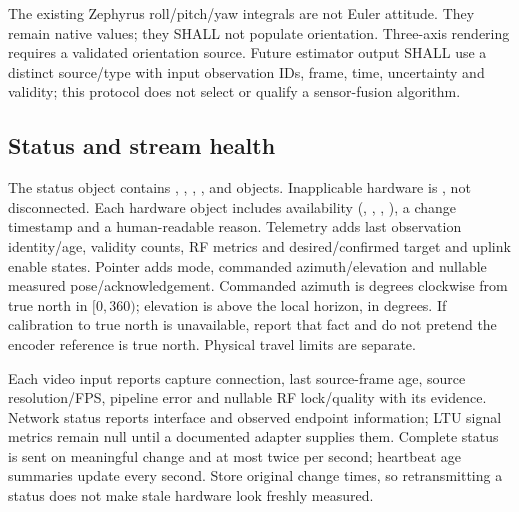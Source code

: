 The existing Zephyrus roll/pitch/yaw integrals are not Euler attitude. They
remain native values; they SHALL not populate orientation. Three-axis rendering
requires a validated orientation source. Future estimator output SHALL use a
distinct source/type with input observation IDs, frame, time, uncertainty and
validity; this protocol does not select or qualify a sensor-fusion algorithm.

\subsection{Status and stream health}
The status object contains , ,
, ,  and  objects.
Inapplicable hardware is , not disconnected. Each hardware object
includes availability (, , ,
), a change timestamp and a human-readable reason. Telemetry adds last
observation identity/age, validity counts, RF metrics and desired/confirmed target
and uplink enable states. Pointer adds mode, commanded azimuth/elevation and
nullable measured pose/acknowledgement. Commanded azimuth is degrees clockwise
from true north in $[0,360)$; elevation is above the local horizon, in degrees.
If calibration to true north is unavailable, report that fact and do not pretend
the encoder reference is true north. Physical travel limits are separate.

Each video input reports capture connection, last source-frame age, source
resolution/FPS, pipeline error and nullable RF lock/quality with its evidence.
Network status reports interface and observed endpoint information; LTU signal
metrics remain null until a documented adapter supplies them. Complete status
is sent on meaningful change and at most twice per second; heartbeat age summaries
update every second. Store original change times, so retransmitting a status
does not make stale hardware look freshly measured.
